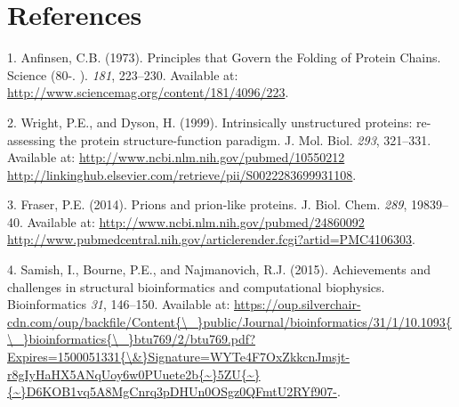 \documentclass[11pt,a4paper,twoside]{book}
\theoremstyle{definition}
\theoremstyle{definition}
\theoremstyle{remark}
\begin{document}
\backmatter

\listoffigures
{}

\listoftables
{}

\chapter*{References}\label{references}

\hypertarget{refs}{}
\hypertarget{ref-Anfinsen1973}{}
1. Anfinsen, C.B. (1973). Principles that Govern the Folding of Protein
Chains. Science (80-. ). \emph{181}, 223--230. Available at:
\url{http://www.sciencemag.org/content/181/4096/223}.

\hypertarget{ref-Wright1999}{}
2. Wright, P.E., and Dyson, H. (1999). Intrinsically unstructured
proteins: re-assessing the protein structure-function paradigm. J. Mol.
Biol. \emph{293}, 321--331. Available at:
\href{http://www.ncbi.nlm.nih.gov/pubmed/10550212\%20http://linkinghub.elsevier.com/retrieve/pii/S0022283699931108}{http://www.ncbi.nlm.nih.gov/pubmed/10550212 http://linkinghub.elsevier.com/retrieve/pii/S0022283699931108}.

\hypertarget{ref-Fraser2014}{}
3. Fraser, P.E. (2014). Prions and prion-like proteins. J. Biol. Chem.
\emph{289}, 19839--40. Available at:
\href{http://www.ncbi.nlm.nih.gov/pubmed/24860092\%20http://www.pubmedcentral.nih.gov/articlerender.fcgi?artid=PMC4106303}{http://www.ncbi.nlm.nih.gov/pubmed/24860092 http://www.pubmedcentral.nih.gov/articlerender.fcgi?artid=PMC4106303}.

\hypertarget{ref-Samish2015}{}
4. Samish, I., Bourne, P.E., and Najmanovich, R.J. (2015). Achievements
and challenges in structural bioinformatics and computational
biophysics. Bioinformatics \emph{31}, 146--150. Available at:
\href{https://oup.silverchair-cdn.com/oup/backfile/Content\%7B/_\%7Dpublic/Journal/bioinformatics/31/1/10.1093\%7B/_\%7Dbioinformatics\%7B/_\%7Dbtu769/2/btu769.pdf?Expires=1500051331\%7B/\&\%7DSignature=WYTe4F7OxZkkcnJmsjt-r8gIyHaHX5ANqUoy6w0PUuete2b\%7B~\%7D5ZU\%7B~\%7D\%7B~\%7DD6KOB1vq5A8MgCnrq3pDHUn0OSgz0QFmtU2RYf907-}{https://oup.silverchair-cdn.com/oup/backfile/Content\{\textbackslash{}\_\}public/Journal/bioinformatics/31/1/10.1093\{\textbackslash{}\_\}bioinformatics\{\textbackslash{}\_\}btu769/2/btu769.pdf?Expires=1500051331\{\textbackslash{}\&\}Signature=WYTe4F7OxZkkcnJmsjt-r8gIyHaHX5ANqUoy6w0PUuete2b\{\textasciitilde{}\}5ZU\{\textasciitilde{}\}\{\textasciitilde{}\}D6KOB1vq5A8MgCnrq3pDHUn0OSgz0QFmtU2RYf907-}.
\end{document}
